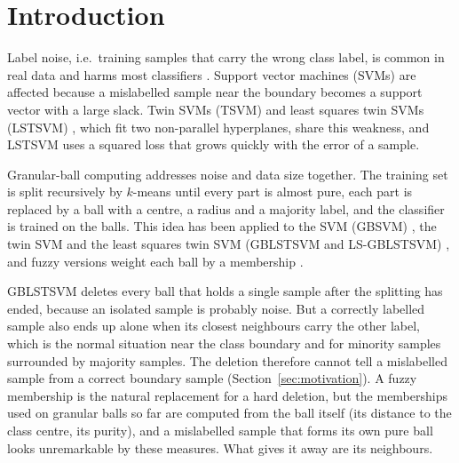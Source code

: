 \documentclass[preprint,12pt]{elsarticle}
\begin{document}
\section{Introduction}
\label{sec:intro}

Label noise, i.e.\ training samples that carry the wrong class label, is common in real data and harms most classifiers \cite{frenay2014}. Support vector machines (SVMs) \cite{cortes1995} are affected because a mislabelled sample near the boundary becomes a support vector with a large slack. Twin SVMs (TSVM) \cite{jayadeva2007} and least squares twin SVMs (LSTSVM) \cite{kumar2009}, which fit two non-parallel hyperplanes, share this weakness, and LSTSVM uses a squared loss that grows quickly with the error of a sample.

Granular-ball computing \cite{xia2019} addresses noise and data size together. The training set is split recursively by $k$-means until every part is almost pure, each part is replaced by a ball with a centre, a radius and a majority label, and the classifier is trained on the balls. This idea has been applied to the SVM (GBSVM) \cite{xia2022gbsvm}, the twin SVM \cite{quadir2024gbtsvm} and the least squares twin SVM (GBLSTSVM and LS-GBLSTSVM) \cite{tanveer2024gblstsvm}, and fuzzy versions weight each ball by a membership \cite{xia2024gbfsvm,lang2025gbftsvm,liu2026rgbiftsvm}.

GBLSTSVM deletes every ball that holds a single sample after the splitting has ended, because an isolated sample is probably noise. But a correctly labelled sample also ends up alone when its closest neighbours carry the other label, which is the normal situation near the class boundary and for minority samples surrounded by majority samples. The deletion therefore cannot tell a mislabelled sample from a correct boundary sample (Section~\ref{sec:motivation}). A fuzzy membership is the natural replacement for a hard deletion, but the memberships used on granular balls so far are computed from the ball itself (its distance to the class centre, its purity), and a mislabelled sample that forms its own pure ball looks unremarkable by these measures. What gives it away are its neighbours.
\end{document}
